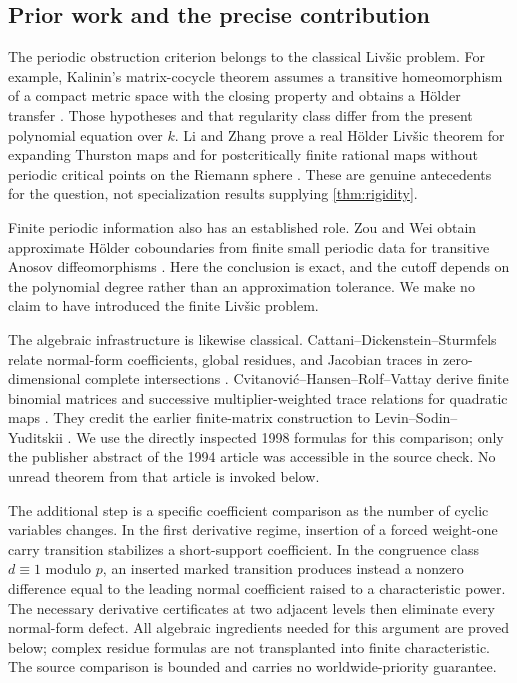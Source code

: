 \subsection{Prior work and the precise contribution}

The periodic obstruction criterion belongs to the classical
Liv\v{s}ic problem. For example, Kalinin's matrix-cocycle theorem
assumes a transitive homeomorphism of a compact metric space with
the closing property and obtains a H\"older transfer
\cite[Theorem~1.1]{kalinin2011livsic}. Those hypotheses and that
regularity class differ from the present polynomial equation over
$k$. Li and Zhang prove a real H\"older Liv\v{s}ic theorem for
expanding Thurston maps and for postcritically finite rational maps
without periodic critical points on the Riemann sphere
\cite[Theorem~1.1]{li2025ground}. These are genuine antecedents for
the question, not specialization results supplying \cref{thm:rigidity}.

Finite periodic information also has an established role. Zou and
Wei obtain approximate H\"older coboundaries from finite small
periodic data for transitive Anosov diffeomorphisms
\cite[Theorem~1.1]{zou2025finite}. Here the conclusion is exact,
and the cutoff depends on the polynomial degree rather than an
approximation tolerance. We make no claim to have introduced the
finite Liv\v{s}ic problem.

The algebraic infrastructure is likewise classical.
Cattani--Dickenstein--Sturmfels relate normal-form coefficients,
global residues, and Jacobian traces in zero-dimensional complete
intersections \cite[Section~4]{cattani1996residues}.
Cvitanovi\'c--Hansen--Rolf--Vattay derive finite binomial matrices
and successive multiplier-weighted trace relations for quadratic
maps \cite[Section~4]{cvitanovic1998beyond}. They credit the earlier
finite-matrix construction to Levin--Sodin--Yuditskii
\cite{levin1994ruelle}. We use the directly inspected 1998 formulas
for this comparison; only the publisher abstract of the 1994
article was accessible in the source check. No unread theorem
from that article is invoked below.

The additional step is a specific coefficient comparison as the
number of cyclic variables changes. In the first derivative regime,
insertion of a forced weight-one carry transition stabilizes a
short-support coefficient. In the congruence class $d\equiv1$
modulo $p$, an inserted marked transition produces instead a
nonzero difference equal to the leading normal coefficient raised
to a characteristic power. The necessary derivative certificates
at two adjacent levels then eliminate every normal-form defect.
All algebraic ingredients needed for this argument are proved
below; complex residue formulas are not transplanted into finite
characteristic. The source comparison is bounded and carries no
worldwide-priority guarantee.

